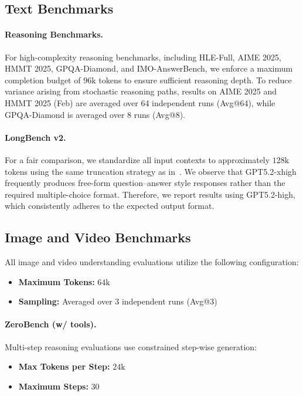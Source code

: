 \subsection{Text Benchmarks}
\label{app:eval_text}



\paragraph{Reasoning Benchmarks.}
For high-complexity reasoning benchmarks, including HLE-Full, AIME 2025, HMMT 2025, GPQA-Diamond, and IMO-AnswerBench, we enforce a maximum completion budget of $96\text{k}$ tokens to ensure sufficient reasoning depth. To reduce variance arising from stochastic reasoning paths, results on AIME 2025 and HMMT 2025 (Feb) are averaged over 64 independent runs (Avg@64), while GPQA-Diamond is averaged over 8 runs (Avg@8).

\paragraph{LongBench v2.}\label{app:eval_longcontext}
For a fair comparison, we standardize all input contexts to approximately $128\text{k}$ tokens using the same truncation strategy as in~\cite{bai2025longbenchv2deeperunderstanding}.
We observe that GPT5.2-xhigh frequently produces free-form question--answer style responses rather than the required multiple-choice format.
Therefore, we report results using GPT5.2-high, which consistently adheres to the expected output format.

\subsection{Image and Video Benchmarks}
\label{app:eval_vision}

All image and video understanding evaluations utilize the following configuration:
\begin{itemize}
    \item \textbf{Maximum Tokens:} $64\text{k}$
    \item \textbf{Sampling:} Averaged over 3 independent runs (Avg@3)
\end{itemize}


\paragraph{ZeroBench (w/ tools).} Multi-step reasoning evaluations use constrained step-wise generation:
\begin{itemize}
    \item \textbf{Max Tokens per Step:} $24\text{k}$
    \item \textbf{Maximum Steps:} $30$
\end{itemize}

